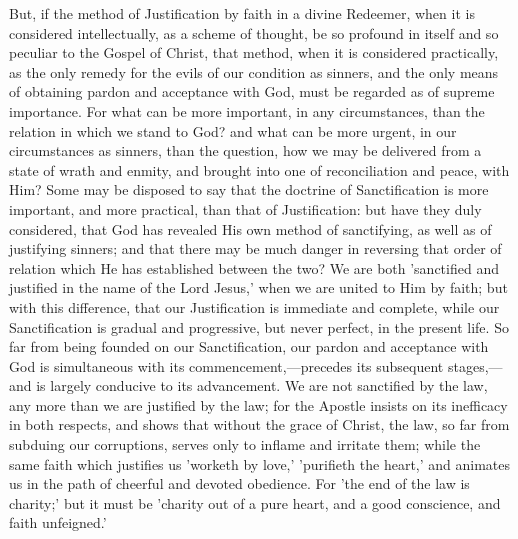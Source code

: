 \documentclass[
]{book}
\begin{document}
But, if the method of Justification by faith in a divine Redeemer, when it is considered intellectually, as a scheme of thought, be so profound in itself and so peculiar to the Gospel of Christ, that method, when it is considered practically, as the only remedy for the evils of our condition as sinners, and the only means of obtaining pardon and acceptance with God, must be regarded as of supreme importance. For what can be more important, in any circumstances, than the relation in which we stand to God? and what can be more urgent, in our circumstances as sinners, than the question, how we may be delivered from a state of wrath and enmity, and brought into one of reconciliation and peace, with Him? Some may be disposed to say that the doctrine of Sanctification is more important, and more practical, than that of Justification: but have they duly considered, that God has revealed His own method of sanctifying, as well as of justifying sinners; and that there may be much danger in reversing that order of relation which He has established between the two? We are both 'sanctified and justified in the name of the Lord Jesus,' when we are united to Him by faith; but with this difference, that our Justification is immediate and complete, while our Sanctification is gradual and progressive, but never perfect, in the present life. So far from being founded on our Sanctification, our pardon and acceptance with God is simultaneous with its commencement,---precedes its subsequent stages,---and is largely conducive to its advancement. We are not sanctified by the law, any more than we are justified by the law; for the Apostle insists on its inefficacy in both respects, and shows that without the grace of Christ, the law, so far from subduing our corruptions, serves only to inflame and irritate them; while the same faith which justifies us 'worketh by love,' 'purifieth the heart,' and animates us in the path of cheerful and devoted obedience. For 'the end of the law is charity;' but it must be 'charity out of a pure heart, and a good conscience, and faith unfeigned.'
\end{document}
